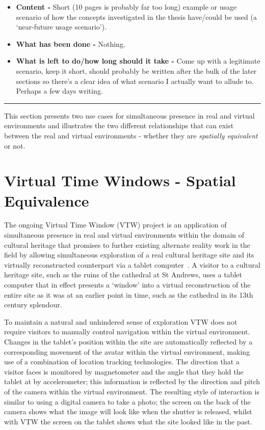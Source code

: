 \begin{itemize}
	\item \textbf{Content -} Short (10 pages is probably far too long) example or usage scenario of how the concepts investigated in the thesis have/could be used (a `near-future usage scenario').
	\item \textbf{What has been done -} Nothing.
	\item \textbf{What is left to do/how long should it take -} Come up with a legitimate scenario, keep it short, should probably be written after the bulk of the later sections so there's a clear idea of what scenario I actually want to allude to. Perhaps a few days writing.
\end{itemize}

\hrule

\vspace{10mm}

This section presents two use cases for simultaneous presence in real and virtual environments and illustrates the two different relationships that can exist between the real and virtual environments - whether they are \textit{spatially equivalent} or not.

\section{Virtual Time Windows - Spatial Equivalence}
The ongoing Virtual Time Window (VTW) project is an application of simultaneous presence in real and virtual environments within the domain of cultural heritage that promises to further existing alternate reality work in the field by allowing simultaneous exploration of a real cultural heritage site and its virtually reconstructed counterpart via a tablet computer~\cite{Davies2012}. A visitor to a cultural heritage site, such as the ruins of the cathedral at St Andrews, uses a tablet computer that in effect presents a `window' into a virtual reconstruction of the entire site as it was at an earlier point in time, such as the cathedral in its 13th century splendour.

To maintain a natural and unhindered sense of exploration VTW does not require visitors to manually control navigation within the virtual environment. Changes in the tablet's position within the site are automatically reflected by a corresponding movement of the avatar within the virtual environment, making use of a combination of location tracking technologies. The direction that a visitor faces is monitored by magnetometer and the angle that they hold the tablet at by accelerometer; this information is reflected by the direction and pitch of the camera within the virtual environment. The resulting style of interaction is similar to using a digital camera to take a photo; the screen on the back of the camera shows what the image will look like when the shutter is released, whilst with VTW the screen on the tablet shows what the site looked like in the past.

